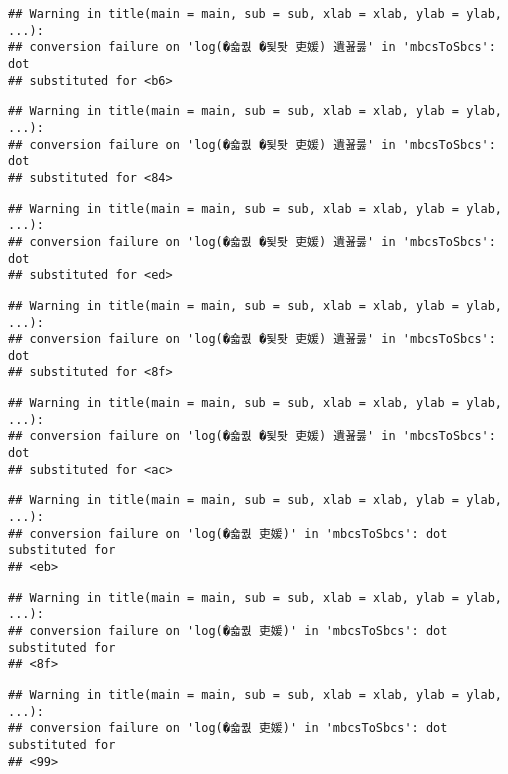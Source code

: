 \documentclass[]{article}
\begin{document}
\begin{verbatim}
## Warning in title(main = main, sub = sub, xlab = xlab, ylab = ylab, ...):
## conversion failure on 'log(�숇퀎 �됯퇏 吏媛) 遺꾪룷' in 'mbcsToSbcs': dot
## substituted for <b6>
\end{verbatim}

\begin{verbatim}
## Warning in title(main = main, sub = sub, xlab = xlab, ylab = ylab, ...):
## conversion failure on 'log(�숇퀎 �됯퇏 吏媛) 遺꾪룷' in 'mbcsToSbcs': dot
## substituted for <84>
\end{verbatim}

\begin{verbatim}
## Warning in title(main = main, sub = sub, xlab = xlab, ylab = ylab, ...):
## conversion failure on 'log(�숇퀎 �됯퇏 吏媛) 遺꾪룷' in 'mbcsToSbcs': dot
## substituted for <ed>
\end{verbatim}

\begin{verbatim}
## Warning in title(main = main, sub = sub, xlab = xlab, ylab = ylab, ...):
## conversion failure on 'log(�숇퀎 �됯퇏 吏媛) 遺꾪룷' in 'mbcsToSbcs': dot
## substituted for <8f>
\end{verbatim}

\begin{verbatim}
## Warning in title(main = main, sub = sub, xlab = xlab, ylab = ylab, ...):
## conversion failure on 'log(�숇퀎 �됯퇏 吏媛) 遺꾪룷' in 'mbcsToSbcs': dot
## substituted for <ac>
\end{verbatim}

\begin{verbatim}
## Warning in title(main = main, sub = sub, xlab = xlab, ylab = ylab, ...):
## conversion failure on 'log(�숇퀎 吏媛)' in 'mbcsToSbcs': dot substituted for
## <eb>
\end{verbatim}

\begin{verbatim}
## Warning in title(main = main, sub = sub, xlab = xlab, ylab = ylab, ...):
## conversion failure on 'log(�숇퀎 吏媛)' in 'mbcsToSbcs': dot substituted for
## <8f>
\end{verbatim}

\begin{verbatim}
## Warning in title(main = main, sub = sub, xlab = xlab, ylab = ylab, ...):
## conversion failure on 'log(�숇퀎 吏媛)' in 'mbcsToSbcs': dot substituted for
## <99>
\end{verbatim}
\end{document}
